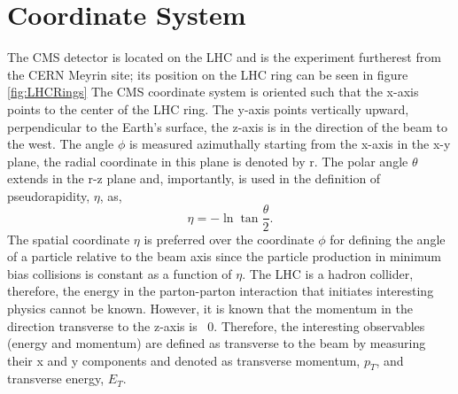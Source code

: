 \section{Coordinate System}
The CMS detector is located on the LHC and is the experiment furtherest from the
CERN Meyrin site; its position on the LHC ring can be seen in figure \ref{fig:LHCRings}
The CMS coordinate system is oriented such that the x-axis points to the center of the LHC
ring. 
The y-axis points vertically upward, perpendicular to the Earth's surface,
the z-axis is in the direction of the beam to the west. The angle $\phi$ is measured
azimuthally starting from the x-axis in the x-y plane, the radial coordinate in this plane
is denoted by r. The polar angle $\theta$ extends in the r-z plane and, importantly,
is used in the definition of pseudorapidity, $\eta$, as, 
\begin{displaymath}
\eta=-\ln{\tan\frac{\theta}{2}}.
\end{displaymath}
The spatial coordinate $\eta$ is preferred over the coordinate $\phi$ for 
defining the angle of a particle relative to the beam axis since
the particle production in minimum bias collisions is constant as a function of $\eta$.
The LHC is a hadron collider, therefore, the energy in the parton-parton interaction
that initiates interesting physics cannot be known. However, it is known that 
the momentum in the direction transverse to the z-axis is ~0. Therefore,
the interesting observables (energy and momentum) are defined as transverse
to the beam by measuring their x and y components and denoted as transverse
momentum, $p_{T}$, and transverse energy, $E_{T}$.%
%
